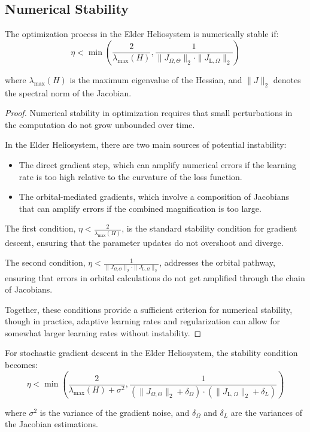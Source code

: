 \subsection{Numerical Stability}

\begin{theorem}
The optimization process in the Elder Heliosystem is numerically stable if:
\begin{equation}
\eta < \min\left(\frac{2}{\lambda_{\max}(H)}, \frac{1}{\|J_{\Omega,\Theta}\|_2 \cdot \|J_{\text{L},\Omega}\|_2}\right)
\end{equation}

where $\lambda_{\max}(H)$ is the maximum eigenvalue of the Hessian, and $\|J\|_2$ denotes the spectral norm of the Jacobian.
\end{theorem}

\begin{proof}
Numerical stability in optimization requires that small perturbations in the computation do not grow unbounded over time.

In the Elder Heliosystem, there are two main sources of potential instability:
\begin{itemize}
    \item The direct gradient step, which can amplify numerical errors if the learning rate is too high relative to the curvature of the loss function.
    \item The orbital-mediated gradients, which involve a composition of Jacobians that can amplify errors if the combined magnification is too large.
\end{itemize}

The first condition, $\eta < \frac{2}{\lambda_{\max}(H)}$, is the standard stability condition for gradient descent, ensuring that the parameter updates do not overshoot and diverge.

The second condition, $\eta < \frac{1}{\|J_{\Omega,\Theta}\|_2 \cdot \|J_{\text{L},\Omega}\|_2}$, addresses the orbital pathway, ensuring that errors in orbital calculations do not get amplified through the chain of Jacobians.

Together, these conditions provide a sufficient criterion for numerical stability, though in practice, adaptive learning rates and regularization can allow for somewhat larger learning rates without instability.
\end{proof}

\begin{theorem}
For stochastic gradient descent in the Elder Heliosystem, the stability condition becomes:
\begin{equation}
\eta < \min\left(\frac{2}{\lambda_{\max}(H) + \sigma^2}, \frac{1}{(\|J_{\Omega,\Theta}\|_2 + \delta_{\Omega}) \cdot (\|J_{\text{L},\Omega}\|_2 + \delta_L)}\right)
\end{equation}

where $\sigma^2$ is the variance of the gradient noise, and $\delta_{\Omega}$ and $\delta_L$ are the variances of the Jacobian estimations.
\end{theorem}

